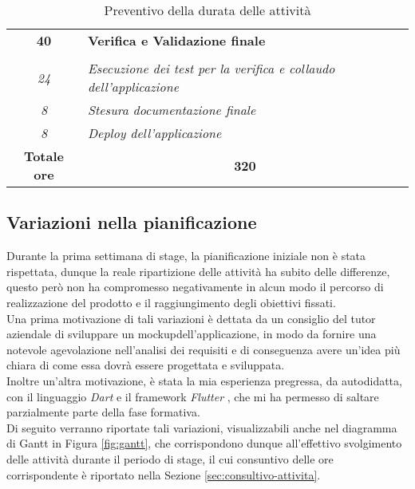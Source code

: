 \begin{table}
\begin{tabularx}{\textwidth}{|c|X|}
            \textbf{40} & \textbf{Verifica e Validazione finale}  \\ \hdashline 
            \multirow{3}{0cm}\\ 
            \textit{24} & 
            \textit{Esecuzione dei test per la verifica e collaudo dell'applicazione} \\
            \textit{8} & 
            \textit{Stesura documentazione finale} \\
            \textit{8} & 
            \textit{Deploy dell'applicazione} \\
            \hline
            
            \textbf{Totale ore} & \multicolumn{1}{|c|}{\textbf{320}} \\ 
            \hline
            
        \end{tabularx}
        \caption{Preventivo della durata delle attività}
        \label{tab:preventivo-ore}
    \end{table}

\subsection{Variazioni nella pianificazione}
\label{subsec:variazione-pianificazione}

Durante la prima settimana di stage, la pianificazione iniziale non è stata rispettata, dunque la reale ripartizione delle attività ha subito delle differenze, questo però non ha compromesso negativamente in alcun modo il percorso di realizzazione del prodotto e il raggiungimento degli obiettivi fissati.\\
Una prima motivazione di tali variazioni è dettata da un consiglio del tutor aziendale di sviluppare un \gls{mockup}\glsoccur dell'applicazione, in modo da fornire una notevole agevolazione nell'analisi dei requisiti e di conseguenza avere un'idea più chiara di come essa dovrà essere progettata e sviluppata.\\
Inoltre un'altra motivazione, è stata la mia esperienza pregressa, da autodidatta, con il linguaggio \emph{Dart} \cite{site:dart} e il framework \emph{Flutter} \cite{site:flutter}, che mi ha permesso di saltare parzialmente parte della fase formativa.\\
Di seguito verranno riportate tali variazioni, visualizzabili anche nel diagramma di Gantt in Figura \ref{fig:gantt}, che corrispondono dunque all'effettivo svolgimento delle attività durante il periodo di stage, il cui consuntivo delle ore corrispondente è riportato nella Sezione \ref{sec:consultivo-attivita}.

